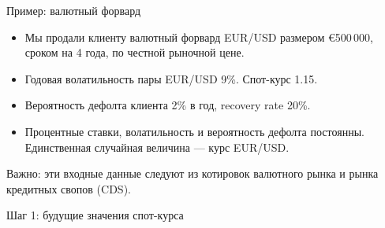 \documentclass{beamer}
\begin{document}
\begin{frame}{Пример: валютный форвард}
\begin{itemize}
\justifying
\item Мы продали клиенту валютный форвард EUR/USD размером \euro500\,000, сроком на 4 года, по честной рыночной цене.
\item Годовая волатильность пары EUR/USD 9\%. Спот-курс 1.15.
\item Вероятность дефолта клиента 2\% в год, recovery rate 20\%.
\item Процентные ставки, волатильность и вероятность дефолта постоянны. Единственная случайная величина --- курс EUR/USD.
\end{itemize}

\justify
\vspace{\baselineskip}
Важно: эти входные данные следуют из котировок валютного рынка и рынка кредитных свопов (CDS).
\end{frame}



\begin{frame}{Шаг 1: будущие значения спот-курса}
\begin{figure}
\centering
\end{figure}
\end{frame}
\end{document}
